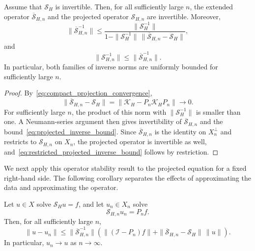 \documentclass[final,onefignum,onetabnum]{siamart250211}
\theoremstyle{definition}
\begin{document}
\begin{proposition}
\label{prop:projected_trace_stability}
Assume that $\mathcal S_H$ is invertible.  Then, for all sufficiently large $n$, the extended operator $\overline{\mathcal S}_{H,n}$ and the projected operator $\mathcal S_{H,n}$ are invertible.  Moreover,
\begin{equation}
  \|\overline{\mathcal S}_{H,n}^{-1}\|
  \le
  \frac{\|\mathcal S_H^{-1}\|}
  {1-\|\mathcal S_H^{-1}\|\,
  \|\overline{\mathcal S}_{H,n}-\mathcal S_H\|},
  \label{eq:projected_inverse_bound}
\end{equation}
and
\begin{equation}
  \|\mathcal S_{H,n}^{-1}\|
  \le \|\overline{\mathcal S}_{H,n}^{-1}\|.
  \label{eq:restricted_projected_inverse_bound}
\end{equation}
In particular, both families of inverse norms are uniformly bounded for sufficiently large $n$.
\end{proposition}

\begin{proof}
By~\eqref{eq:compact_projection_convergence},
\[
  \|\overline{\mathcal S}_{H,n}-\mathcal S_H\|
  =\|\mathcal K_H-P_n\mathcal K_HP_n\|\to0.
\]
For sufficiently large $n$, the product of this norm with $\|\mathcal S_H^{-1}\|$ is smaller than one.  A Neumann-series argument then gives invertibility of $\overline{\mathcal S}_{H,n}$ and the bound~\eqref{eq:projected_inverse_bound}.  Since $\overline{\mathcal S}_{H,n}$ is the identity on $X_n^\perp$ and restricts to $\mathcal S_{H,n}$ on $X_n$, the projected operator is invertible as well, and~\eqref{eq:restricted_projected_inverse_bound} follows by restriction.
\end{proof}

We next apply this operator stability result to the projected equation for a fixed right-hand side.  The following corollary separates the effects of approximating the data and approximating the operator.

\begin{corollary}
\label{cor:projected_solution_convergence}
Let $u\in X$ solve $\mathcal S_Hu=f$, and let $u_n\in X_n$ solve
\[
  \mathcal S_{H,n}u_n=P_nf.
\]
Then, for all sufficiently large $n$,
\begin{equation}
  \|u-u_n\|
  \le
  \|\overline{\mathcal S}_{H,n}^{-1}\|
  \left(
  \|(\mathcal I-P_n)f\|
  +\|\overline{\mathcal S}_{H,n}-\mathcal S_H\|\,\|u\|
  \right).
  \label{eq:projected_solution_error}
\end{equation}
In particular, $u_n\to u$ as $n\to\infty$.
\end{corollary}
\end{document}
